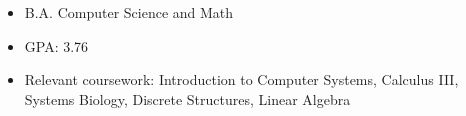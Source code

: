 \documentclass[a4paper]{resume}
\begin{document}
\vspace*{-20pt}



\vspace{10pt}

\begin{itemize} \vspace{-5pt} \itemsep -2pt
	\item B.A. Computer Science and Math
	\item GPA: 3.76
	\item Relevant coursework: Introduction to Computer Systems, Calculus III, Systems Biology, Discrete Structures, Linear Algebra
\end{itemize}
\enresection
\end{document}
